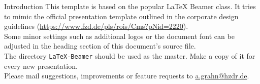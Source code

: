\begin{frame}{Introduction}
  This template is based on the popular \LaTeX{} Beamer class. It tries to
  mimic the official presentation template outlined in the corporate design
  guidelines (\url{https://www.fzd.de/pls/rois/Cms?pNid=2220}).\\[1ex]
  Some minor settings such as additional logos or the document font can be
  adjusted in the heading section of this document's source file.\\[1ex]
  The directory {\tt LaTeX-Beamer} should be used as the master. Make a copy of
  it for every new presentation.\\[1ex]
  Please mail suggestions, improvements or feature requests to
  \url{a.grahn@hzdr.de}.\\[1ex]
\end{frame}

